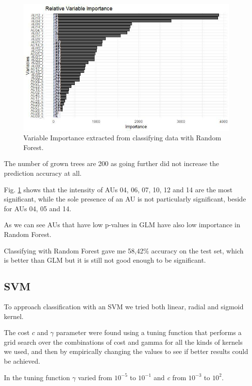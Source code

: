 \begin{figure}[H]
	\centering
	\includegraphics[width=1\textwidth]{images/varimp}
	\caption{Variable Importance extracted from classifying data with Random Forest.}
	\label{fig:varimp}
\end{figure}

The number of grown trees are 200 as going further did not increase the prediction accuracy at all.

Fig. \ref{fig:varimp} shows that the intensity of AUs 04, 06, 07, 10, 12 and 14 are the most significant, while the sole presence of an AU is not particularly significant, beside for AUs 04, 05 and 14.

As we can see AUs that have low p-values in GLM have also low importance in Random Forest.

Classifying with Random Forest gave me 58,42\% accuracy on the test set, which is better than GLM but it is still not good enough to be significant.

\clearpage

\subsection{SVM} \label{SVM}
To approach classification with an SVM we tried both linear, radial and sigmoid kernel.

The cost $c$ and $\gamma$ parameter were found using a tuning function that performs a grid search over the combinations of cost and gamma for all the kinds of kernels we used, and then by empirically changing the values to see if better results could be achieved. 

In the tuning function $\gamma$ varied from $10^{-5}$ to $10^{-1}$ and \textit{c} from $10^{-3}$ to $10^2$. 

